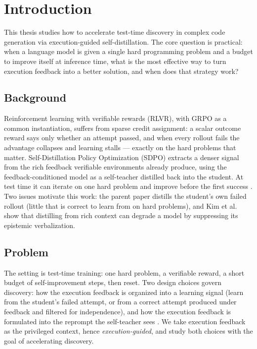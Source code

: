 \chapter{Introduction}\label{chapter-1-introduction}

This thesis studies how to accelerate test-time discovery in complex code generation via execution-guided self-distillation. The core question is practical: when a language model is given a single hard programming problem and a budget to improve itself at inference time, what is the most effective way to turn execution feedback into a better solution, and when does that strategy work?

\section{Background}\label{background}

Reinforcement learning with verifiable rewards (RLVR), with GRPO \cite{r8} as a common instantiation, suffers from sparse credit assignment: a scalar outcome reward says only whether an attempt passed, and when every rollout fails the advantage collapses and learning stalls --- exactly on the hard problems that matter. Self-Distillation Policy Optimization (SDPO) \cite{r1} extracts a denser signal from the rich feedback verifiable environments already produce, using the feedback-conditioned model as a self-teacher distilled back into the student. At test time it can iterate on one hard problem and improve before the first success \cite{r1}. Two issues motivate this work: the parent paper distills the student's own failed rollout (little that is correct to learn from on hard problems), and Kim et al.~\cite{r2} show that distilling from rich context can degrade a model by suppressing its epistemic verbalization.

\section{Problem}\label{problem}

The setting is test-time training: one hard problem, a verifiable reward, a short budget of self-improvement steps, then reset. Two design choices govern discovery: how the execution feedback is organized into a learning signal (learn from the student's failed attempt, or from a correct attempt produced under feedback and filtered for independence), and how the execution feedback is formulated into the reprompt the self-teacher sees \cite{r1}. We take execution feedback as the privileged context, hence \emph{execution-guided}, and study both choices with the goal of accelerating discovery.

